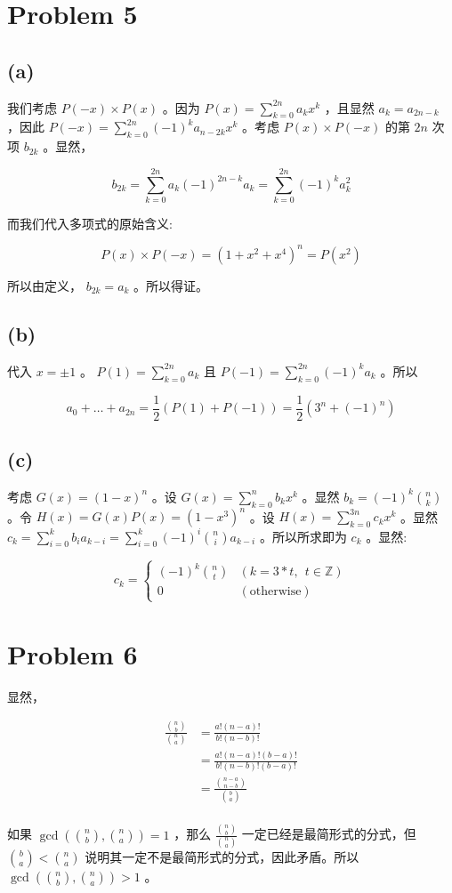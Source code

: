 \documentclass{article}
\begin{document}
\section*{Problem 5}

\subsection*{(a)}

我们考虑 $P(-x) \times P(x)$ 。因为 $P(x) = \sum_{k = 0}^{2n} {a_k x^k} $ ，且显然 $a_k = a_{2n-k}$ ，因此 $P(-x) = \sum_{k = 0}^{2n} {(-1)^k a_{n-2k} x^k}$ 。考虑 $P(x) \times P(-x)$ 的第 $2n$ 次项 $b_{2k}$ 。显然，

$$b_{2k} =\sum_{k = 0}^{2n} {a_k (-1)^{2n-k} a_k} = \sum_{k = 0}^{2n} {(-1)^k a_k^2 }$$

而我们代入多项式的原始含义:

$$P(x) \times P(-x) = (1 + x^2 + x^4)^n = P(x^2)$$

所以由定义， $b_{2k} = a_k$ 。所以得证。

\subsection*{(b)}

代入 $x = \pm 1$ 。 $P(1) = \sum_{k=0}^{2n}{a_k}$ 且 $P(-1) = \sum_{k=0}^{2n}{(-1)^k a_k}$ 。所以

$$ a_0 + \dots + a_{2n} = \frac{1}{2}(P(1) + P(-1)) = \frac{1}{2}(3^n + (-1)^n) $$

\subsection*{(c)}

考虑 $G(x) = (1 - x) ^ n $ 。设 $G(x) = \sum_{k=0}^{n}{b_k x^k}$ 。显然 $b_k = (-1)^k {n \choose k}$ 。令 $H(x) = G(x) P(x) = (1 - x^3) ^ n$ 。设 $H(x) = \sum_{k=0}^{3n}{c_k x^k}$ 。显然 $c_k = \sum_{i=0}^{k}{b_i a_{k-i}} = \sum_{i=0}^{k}{(-1)^i {n \choose i} a_{k-i}}$ 。所以所求即为 $c_k$ 。显然:

$$
c_k =
\begin{cases}
    (-1)^k {n \choose t} & (k = 3 * t,~\ t \in \mathbb{Z}) \\
    0 & (\text{otherwise})
\end{cases}
$$

\section*{Problem 6}

显然，

$$
\begin{aligned}
\frac{{n \choose b}} {{n \choose a}} 
    &= \frac{a! (n - a)!} {b! (n - b)!} \\
    &= \frac{a! (n - a)! (b - a)!} {b! (n - b)! (b - a)!} \\
    &= \frac{ {{n - a} \choose {n - b}} } { {b \choose {a}} } \\
\end{aligned}
$$

如果 $\gcd ({n \choose b},{n \choose a}) = 1$ ，那么 $\frac{{n \choose b}} {{n \choose a}}$ 一定已经是最简形式的分式，但 ${b \choose a} < { n \choose a} $ 说明其一定不是最简形式的分式，因此矛盾。所以 $\gcd ({n \choose b},{n \choose a}) > 1$ 。
\end{document}

